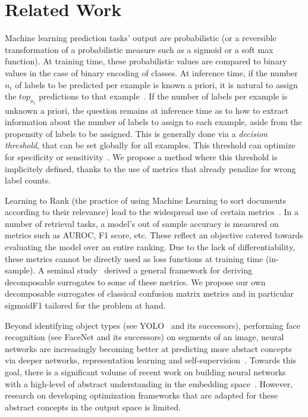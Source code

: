 
\section{Related Work}
\label{sec:org2aceb9f}

Machine learning prediction tasks' output are probabilistic (or a reversible transformation of a probabilistic measure such as a sigmoid or a soft max function). At training time, these probabilistic values are compared to binary values in the case of binary encoding of classes. At inference time, if the number $n_i$ of labels to be predicted per example is known a priori, it is natural to assign the $top_{n_i}$ predictions to that example~\cite{lossTopKError, topKmulticlassSVM}. If the number of labels per example is unknown a priori, the question remains at inference time as to how to extract information about the number of labels to assign to each example, aside from the propensity of labels to be assigned. This is generally done via a \emph{decision threshold}, that can be set globally for all examples. This threshold can optimize for specificity or sensitivity~\cite{decisionThreshold}. We propose a method where this threshold is implicitely defined, thanks to the use of metrics that already penalize for wrong label counts.

Learning to Rank (the practice of using Machine Learning to sort documents according to their relevance) lead to the widespread use of certain metrics~\cite{LTR}. In a number of retrieval tasks, a model's out of sample accuracy is measured on metrics such as AUROC, F1 score, etc. These reflect an objective catered towards evaluating the model over an entire ranking. Due to the lack of differentiability, these metrics cannot be directly used as loss functions at training time (in-sample). A seminal study~\cite{optimizableLosses} derived a general framework for deriving decomposable surrogates to some of these metrics. We propose our own decomposable surrogates of classical confusion matrix metrics and in particular sigmoidF1 tailored for the problem at hand.

Beyond identifying object types (see YOLO~\cite{YOLO} and its successors), performing face recognition (see FaceNet\cite{FaceNet} and its successors) on segments of an image, neural networks
are increasingly becoming better at predicting more abstact concepts via
deeper networks, representation learning and self-supervision~\citep[see,
e.g.,][]{SS,Rep}. Towards this goal, there is a significant volume of recent
work on building neural networks with a high-level of abstract understanding
in the embedding space~. However, research on developing optimization
frameworks that are adapted for these abstract concepts in the output space is
limited.

